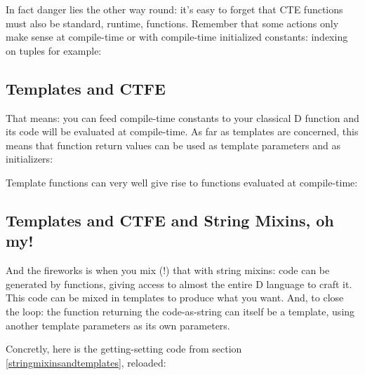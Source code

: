 In fact danger lies the other way round: it's easy to forget that CTE functions must also be standard, runtime, functions. Remember that some actions only make sense at compile-time or with compile-time initialized constants: indexing on tuples for example:

\subsection{}


\subsection{Templates and CTFE} \label{templatesandctfe}


That means: you can feed compile-time constants to your classical D function and its code will be evaluated at compile-time. As far as templates are concerned, this means that function return values can be used as template parameters and as  initializers:

\begin{dcode}

\end{dcode}

Template functions can very well give rise to functions evaluated at compile-time:

\begin{dcode}
\end{dcode}

\subsection{Templates and CTFE and String Mixins, oh my!}
\label{templatesandctfeandstringmixins}

And the fireworks is when you mix (!) that with string mixins: code can be generated by functions, giving access to almost the entire D language to craft it. This code can be mixed in templates to produce what you want. And, to close the loop: the function returning the code-as-string can itself be a template, using another template parameters as its own parameters.

Concretly, here is the getting-setting code from section \ref{stringmixinsandtemplates}, reloaded:

